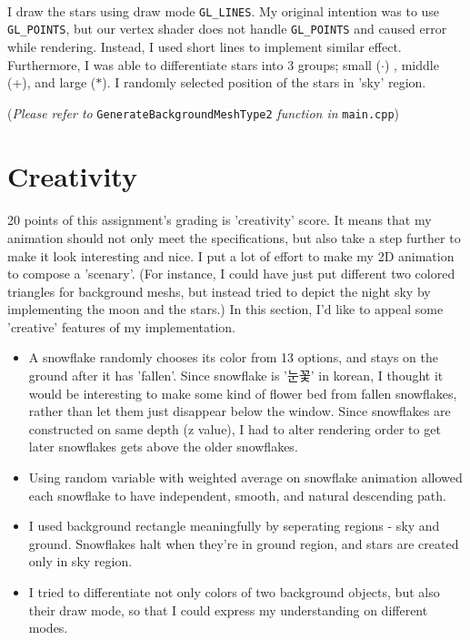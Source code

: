 \documentclass[10pt,a4paper]{article}
\begin{document}
	\paragraph{}
	I draw the stars using draw mode \texttt{GL\_LINES}. My original intention was to use \texttt{GL\_POINTS}, but our vertex shader does not handle \texttt{GL\_POINTS} and caused error while rendering. Instead, I used short lines to implement similar effect. Furthermore, I was able to differentiate stars into 3 groups; small ($ \cdot $) , middle (+), and large ($ \ast $). I randomly selected position of the stars in 'sky' region. 
	
	\begin{flushright}
		(\emph{Please refer to} \texttt{GenerateBackgroundMeshType2} \emph{function in} \texttt{main.cpp})
	\end{flushright}

	\pagebreak
	\section{Creativity}
	\paragraph{}
	20 points of this assignment's grading is 'creativity' score. It means that my animation should not only meet the specifications, but also take a step further to make it look interesting and nice. I put a lot of effort to make my 2D animation to compose a 'scenary'. (For instance, I could have just put different two colored triangles for background meshs, but instead tried to depict the night sky by implementing the moon and the stars.) In this section, I'd like to appeal some 'creative' features of my implementation.
	
	\begin{itemize}
		\item A snowflake randomly chooses its color from 13 options, and stays on the ground after it has 'fallen'. Since snowflake is '눈꽃' in korean, I thought it would be interesting to make some kind of flower bed from fallen snowflakes, rather than let them just disappear below the window. Since snowflakes are constructed on same depth (z value), I had to alter rendering order to get later snowflakes gets above the older snowflakes.
		
		\item Using random variable with weighted average on snowflake animation allowed each snowflake to have independent, smooth, and natural descending path. 
		
		\item I used background rectangle meaningfully by seperating regions - sky and ground. Snowflakes halt when they're in ground region, and stars are created only in sky region.
		
		\item I tried to differentiate not only colors of two background objects, but also their draw mode, so that I could express my understanding on different modes.
		
	\end{itemize} 
		
	
\end{document}
